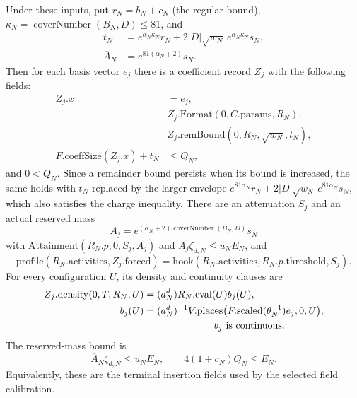 \begin{proposition}
\label{prop:ex-marked-invitation}
Under these inputs, put $r_N=b_N+c_N$ (the regular bound),
$\kappa_N=\operatorname{coverNumber}(B_N,D)\leq81$, and
\begin{align*}
 t_N&=e^{\alpha_N\kappa_N}r_N
       +2|D|\sqrt{w_N}\,e^{\alpha_N\kappa_N}s_N,\\
 \overline A_N&=e^{81(\alpha_N+2)}s_N.
\end{align*}
Then for each basis vector $e_j$ there is a coefficient record $Z_j$
with the following fields:
\begin{align*}
 Z_j.x&=e_j,\\
 &Z_j.\mathrm{Format}(0,C.\mathrm{params},R_N),\\
 &Z_j.\mathrm{remBound}(0,R_N,\sqrt{w_N},t_N),\\
 F.\mathrm{coeffSize}(Z_j.x)+t_N&\leq Q_N,
\end{align*}
and $0<Q_N$. Since a remainder bound persists when its bound is
increased, the same holds with $t_N$ replaced by the larger envelope
$e^{81\alpha_N}r_N+2|D|\sqrt{w_N}\,e^{81\alpha_N}s_N$, which also
satisfies the charge inequality. There are an attenuation $S_j$ and an
actual reserved mass
\[
A_j=e^{(\alpha_N+2)\operatorname{coverNumber}(B_N,D)}s_N
\]
with
$\mathrm{Attainment}(R_N.p,0,S_j,A_j)$ and
$A_j\zeta_{d,N}\leq u_NE_N$, and
\[
 \mathrm{profile}(R_N.\mathrm{activities},Z_j.\mathrm{forced})
   =\mathrm{hook}(R_N.\mathrm{activities},R_N.p.\mathrm{threshold},S_j).
\]
For every configuration $U$, its density and continuity clauses are
\begin{align*}
 Z_j.\mathrm{density}(0,T,R_N,U)
   &=(a_N^d)R_N.\mathrm{eval}(U)b_j(U),\\
 b_j(U)&=(a_N^d)^{-1}
 V.\mathrm{places}\bigl(F.\mathrm{scaled}(\theta_N^{-1})e_j,0,U\bigr),\\
 &\hspace{25mm} b_j\text{ is continuous}.
\end{align*}
The reserved-mass bound is
\[
 \overline A_N\zeta_{d,N}\leq u_NE_N,
 \qquad 4(1+c_N)Q_N\leq E_N.
\]
Equivalently, these are the terminal insertion fields used by the selected
field calibration.
\end{proposition}
